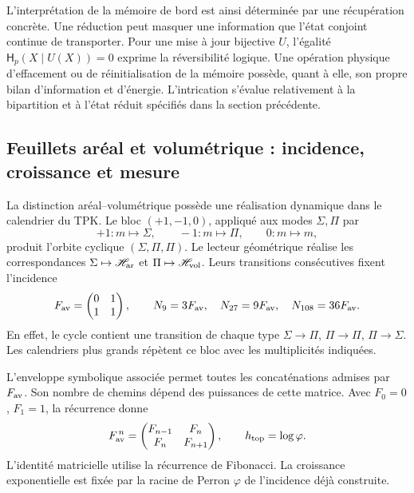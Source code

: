 L'interprétation de la mémoire de bord est ainsi déterminée par
une récupération concrète. Une réduction peut masquer une information
que l'état conjoint continue de transporter. Pour une mise à jour
bijective \(U\), l'égalité \(\mathsf H_p(X\mid U(X))=0\) exprime
la réversibilité logique. Une opération physique d'effacement ou de réinitialisation
de la mémoire possède, quant à elle, son propre bilan d'information et
d'énergie. L'intrication s'évalue relativement à la bipartition et à
l'état réduit spécifiés dans la section précédente.

\subsection{Feuillets aréal et volumétrique : incidence, croissance et mesure}
\label{sec:ii-hojas-av}

La distinction aréal--volumétrique possède une réalisation dynamique dans le
calendrier du TPK. Le bloc \((+1,-1,0)\), appliqué aux modes
\(\Sigma,\Pi\) par
\[
 +1:m\mapsto\Sigma,\qquad -1:m\mapsto\Pi,\qquad 0:m\mapsto m,
\]
produit l’orbite cyclique \((\Sigma,\Pi,\Pi)\). Le lecteur géométrique
réalise les correspondances \(\Sigma\mapsto\mathscr H_{\rm ar}\) et
\(\Pi\mapsto\mathscr H_{\rm vol}\). Leurs transitions consécutives
fixent l’incidence
\begin{equation}
 F_{\rm av}=\begin{pmatrix}0&1\\1&1\end{pmatrix},\qquad
 N_9=3F_{\rm av},\quad N_{27}=9F_{\rm av},\quad
 N_{108}=36F_{\rm av}.
 \label{eq:ii-hojas-incidencia}
\end{equation}
En effet, le cycle contient une transition de chaque type
\(\Sigma\to\Pi\), \(\Pi\to\Pi\), \(\Pi\to\Sigma\).
Les calendriers plus grands répètent ce bloc avec les multiplicités
indiquées.

L'enveloppe symbolique associée permet toutes les concaténations
admises par \(F_{\rm av}\). Son nombre de chemins dépend des
puissances de cette matrice. Avec \(F_0=0\), \(F_1=1\), la récurrence donne
\begin{equation}
 F_{\rm av}^{\,n}=
 \begin{pmatrix}F_{n-1}&F_n\\F_n&F_{n+1}\end{pmatrix},
 \qquad h_{\rm top}=\log\varphi.
 \label{eq:ii-hojas-fibonacci}
\end{equation}
L'identité matricielle utilise la récurrence de Fibonacci. La croissance
exponentielle est fixée par la racine de Perron \(\varphi\) de
l'incidence déjà construite.

